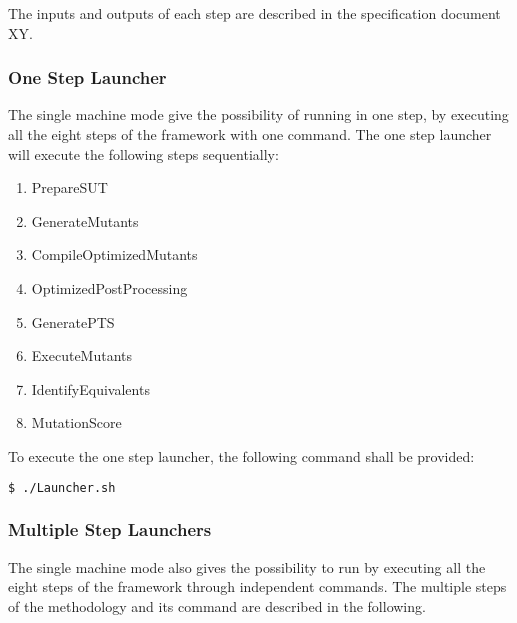 The inputs and outputs of each step are described in the specification document XY.


\subsubsection{One Step Launcher}

The single machine mode give the possibility of running \MASS in one step, by executing all the eight steps of the framework with one command. The one step launcher will execute the following steps sequentially:

\begin{enumerate}
	\item PrepareSUT
	\item GenerateMutants
	\item CompileOptimizedMutants
	\item OptimizedPostProcessing
	\item GeneratePTS
	\item ExecuteMutants
	\item IdentifyEquivalents
	\item MutationScore
\end{enumerate}

To execute the one step launcher, the following command shall be provided:

\begin{lstlisting}[language=bash]
  $ ./Launcher.sh
\end{lstlisting}

\subsubsection{Multiple Step Launchers}

The single machine mode also gives the possibility to run \MASS by executing all the eight steps of the framework through independent commands. 
The multiple steps of the methodology and its command are described in the following.

